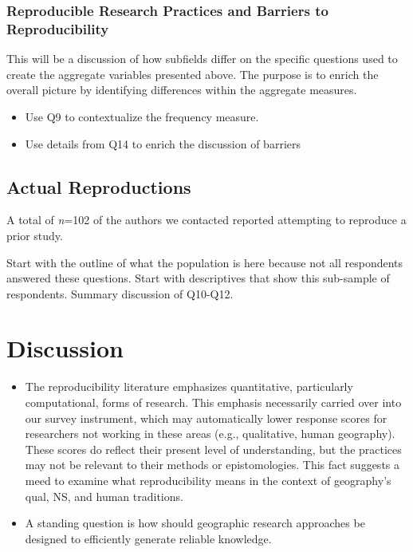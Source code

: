 \documentclass[]{interact}
\theoremstyle{plain}%
\theoremstyle{definition}
\theoremstyle{remark}
\begin{document}
\subsubsection*{Reproducible Research Practices and Barriers to Reproducibility}
This will be a discussion of how subfields differ on the specific questions used to create the aggregate variables presented above. 
The purpose is to enrich the overall picture by identifying differences within the aggregate measures.
\begin{itemize}
    \item Use Q9 to contextualize the frequency measure.
    \item Use details from Q14 to enrich the discussion of barriers
\end{itemize}

\subsection*{Actual Reproductions}
A total of \textit{n}=102 of the authors we contacted reported attempting to reproduce a prior study.

Start with the outline of what the population is here because not all respondents answered these questions. Start with descriptives that show this sub-sample of respondents. Summary discussion of Q10-Q12.


\section*{Discussion}

\begin{itemize}
    \item The reproducibility literature emphasizes quantitative, particularly computational, forms of research. This emphasis necessarily carried over into our survey instrument, which may automatically lower response scores for researchers not working in these areas (e.g., qualitative, human geography). These scores do reflect their present level of understanding, but the practices may not be relevant to their methods or epistomologies. This fact suggests a meed to examine what reproducibility means in the context of geography's qual, NS, and human traditions.
    \item A standing question is how should geographic research approaches be designed to efficiently generate reliable knowledge.
\end{itemize}
\end{document}

